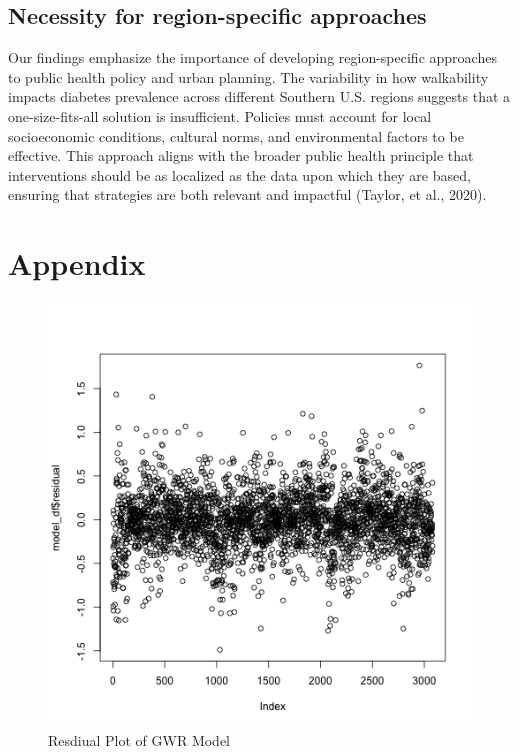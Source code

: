\documentclass[
]{article}
\begin{document}
\subsection{Necessity for region-specific
approaches}\label{necessity-for-region-specific-approaches}

Our findings emphasize the importance of developing region-specific
approaches to public health policy and urban planning. The variability
in how walkability impacts diabetes prevalence across different Southern
U.S. regions suggests that a one-size-fits-all solution is insufficient.
Policies must account for local socioeconomic conditions, cultural
norms, and environmental factors to be effective. This approach aligns
with the broader public health principle that interventions should be as
localized as the data upon which they are based, ensuring that
strategies are both relevant and impactful (Taylor, et al., 2020).

\newpage{}

\section{Appendix}\label{appendix}

\begin{figure}[H]

{\centering \includegraphics{residual_plot.png}

}

\caption{Resdiual Plot of GWR Model}

\end{figure}%
\end{document}
